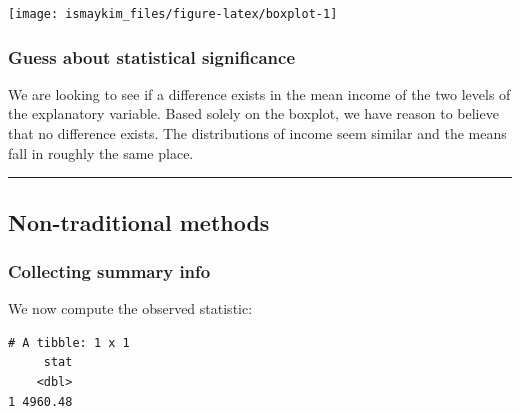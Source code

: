 \documentclass[12pt, krantz2,]{krantz}
\makeatletter
\newenvironment{Shaded}{\begin{snugshade}}{\end{snugshade}}
\newcommand{\DataTypeTok}[1]{\textcolor[rgb]{0.27,0.27,0.27}{#1}}
\newcommand{\KeywordTok}[1]{\textcolor[rgb]{0.27,0.27,0.27}{\textbf{#1}}}
\newcommand{\NormalTok}[1]{#1}
\newcommand{\OperatorTok}[1]{\textcolor[rgb]{0.43,0.43,0.43}{\textbf{#1}}}
\newcommand{\StringTok}[1]{\textcolor[rgb]{0.5,0.5,0.5}{#1}}
\newenvironment{kframe}{%
\medskip{}
\setlength{\fboxsep}{.8em}
 \def\at@end@of@kframe{}%
 \ifinner\ifhmode%
  \def\at@end@of@kframe{\end{minipage}}%
  \begin{minipage}{\columnwidth}%
 \fi\fi%
 \def\FrameCommand##1{\hskip\@totalleftmargin \hskip-\fboxsep
 \colorbox{shadecolor}{##1}\hskip-\fboxsep
     \hskip-\linewidth \hskip-\@totalleftmargin \hskip\columnwidth}%
 \MakeFramed {\advance\hsize-\width
   \@totalleftmargin\z@ \linewidth\hsize
   \@setminipage}}%
 {\par\unskip\endMakeFramed%
 \at@end@of@kframe}
\renewenvironment{Shaded}{\begin{kframe}}{\end{kframe}}
\makeatother
\begin{document}
\begin{center}\texttt{[image: ismaykim\_files/figure-latex/boxplot-1]} \end{center}

\hypertarget{guess-about-statistical-significance-3}{%
\subsubsection*{Guess about statistical significance}\label{guess-about-statistical-significance-3}}


We are looking to see if a difference exists in the mean income of the two levels of the explanatory variable. Based solely on the boxplot, we have reason to believe that no difference exists. The distributions of income seem similar and the means fall in roughly the same place.

\begin{center}\rule{0.5\linewidth}{\linethickness}\end{center}

\hypertarget{non-traditional-methods-3}{%
\subsection{Non-traditional methods}\label{non-traditional-methods-3}}

\hypertarget{collecting-summary-info-1}{%
\subsubsection*{Collecting summary info}\label{collecting-summary-info-1}}


We now compute the observed statistic:

\begin{Shaded}
\end{Shaded}

\begin{verbatim}
# A tibble: 1 x 1
     stat
    <dbl>
1 4960.48
\end{verbatim}
\end{document}
